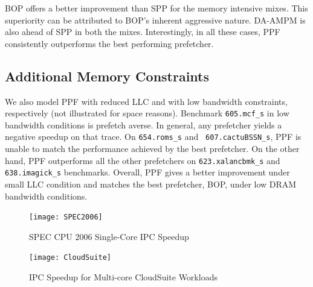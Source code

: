 BOP offers a better improvement than SPP for the memory intensive mixes. This
superiority can be attributed to BOP's inherent aggressive nature.  DA-AMPM is
also ahead of SPP in both the mixes. Interestingly, in all these cases, PPF
consistently outperforms the best performing prefetcher.



\subsection{Additional Memory Constraints}
\label{Results-AdditionalMem}


We also model PPF with reduced LLC and with low bandwidth constraints,
respectively (not illustrated for space reasons).  Benchmark {\tt 605.mcf\_s}
in low bandwidth conditions is prefetch averse.  In general, any prefetcher
yields a negative speedup on that trace.  On {\tt 654.roms\_s} and {\tt
607.cactuBSSN\_s}, PPF is unable to match the performance achieved by the best
prefetcher. On the other hand, PPF outperforms all the other prefetchers on
{\tt 623.xalancbmk\_s} and {\tt 638.imagick\_s} benchmarks.  Overall, PPF
gives a better improvement under small LLC condition and matches the best
prefetcher, BOP, under low DRAM bandwidth conditions.

\begin{figure}[ht]
\texttt{[image: SPEC2006]}
\caption{SPEC CPU 2006 Single-Core IPC Speedup}
\label{Fig:SPEC2006_1core}
\end{figure}

\begin{figure}[ht]
\texttt{[image: CloudSuite]}
\caption{IPC Speedup for Multi-core CloudSuite Workloads}
\label{Fig:CloudSuite}
\end{figure}

